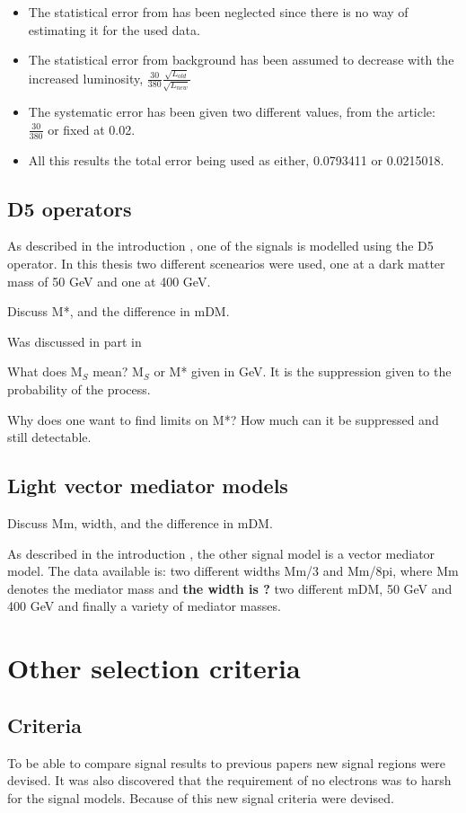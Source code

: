 \begin{itemize}
\item The statistical error from \abbrMC has been neglected since there is no way of estimating it for the used data.
\item The statistical error from background \abbrCR has been assumed to decrease with the increased luminosity, $\frac{30}{380} \frac{\sqrt{L_{old}}}{\sqrt{L_{new}}}$
\item The systematic error has been given two different values, from the article:\\ $\frac{30}{380}$ or fixed at 0.02.
\item All this results the total error being used as either, 0.0793411 or 0.0215018. 
\end{itemize}

\subsection{D5 operators}
As described in the introduction , one of the signals is modelled using the D5 operator. In this thesis two different scenearios were used, one at a dark matter mass of 50 GeV and one at 400 GeV.


Discuss M*, and the difference in mDM. 

Was discussed in part in 

What does M$_S$ mean? M$_S$ or M* given in GeV. It is the suppression given to the probability of the process.

Why does one want to find limits on M*? How much can it be suppressed and still detectable.

\subsection{Light vector mediator models}
Discuss Mm, width, and the difference in mDM. 

As described in the introduction , the other signal model is a vector mediator model. The data available is: two different widths Mm/3 and Mm/8pi, where Mm denotes the mediator mass and \textbf{the width is ?}
two different mDM, 50 GeV and 400 GeV and finally a variety of mediator masses. 
\newpage
\section{Other selection criteria}
\subsection{Criteria}
To be able to compare signal results to previous papers new signal regions were devised. It was also discovered that the requirement of no electrons was to harsh for the signal models. Because of this new signal criteria were devised.

